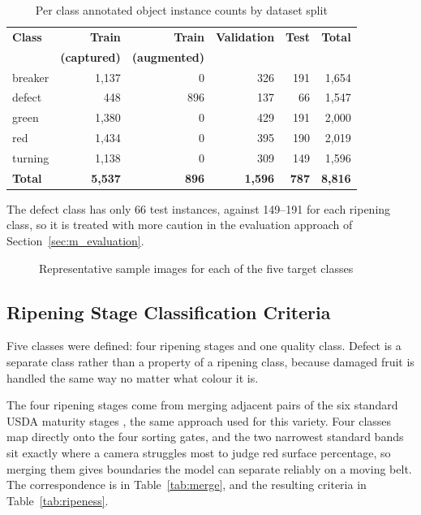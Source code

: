 \begin{table}[H]
\caption{Per class annotated object instance counts by dataset split}
\label{tab:instances}
\centering
\begin{tabular}{lrrrrr}
\toprule
\textbf{Class} & \textbf{Train} & \textbf{Train} & \textbf{Validation} & \textbf{Test} & \textbf{Total} \\
 & \textbf{(captured)} & \textbf{(augmented)} & & & \\
\midrule
breaker & 1{,}137 & 0   & 326 & 191 & 1{,}654 \\
defect  & 448   & 896 & 137 & 66  & 1{,}547 \\
green   & 1{,}380 & 0   & 429 & 191 & 2{,}000 \\
red     & 1{,}434 & 0   & 395 & 190 & 2{,}019 \\
turning & 1{,}138 & 0   & 309 & 149 & 1{,}596 \\
\midrule
\textbf{Total} & \textbf{5{,}537} & \textbf{896} & \textbf{1{,}596} & \textbf{787} & \textbf{8{,}816} \\
\bottomrule
\end{tabular}
\end{table}

The defect class has only 66 test instances, against 149--191 for each ripening class, so it is treated with more caution in the evaluation approach of Section~\ref{sec:m_evaluation}.

\begin{figure}[H]
\centering
{}
\caption{Representative sample images for each of the five target classes}
\label{fig:classes}
\end{figure}

\subsection{Ripening Stage Classification Criteria}
\label{sec:m_classes}

Five classes were defined: four ripening stages and one quality class. Defect is a separate class rather than a property of a ripening class, because damaged fruit is handled the same way no matter what colour it is.

The four ripening stages come from merging adjacent pairs of the six standard \acrshort{USDA} maturity stages \citep{usda1991}, the same approach \citet{abekoon2024} used for this variety. Four classes map directly onto the four sorting gates, and the two narrowest standard bands sit exactly where a camera struggles most to judge red surface percentage, so merging them gives boundaries the model can separate reliably on a moving belt. The correspondence is in Table~\ref{tab:merge}, and the resulting criteria in Table~\ref{tab:ripeness}.

